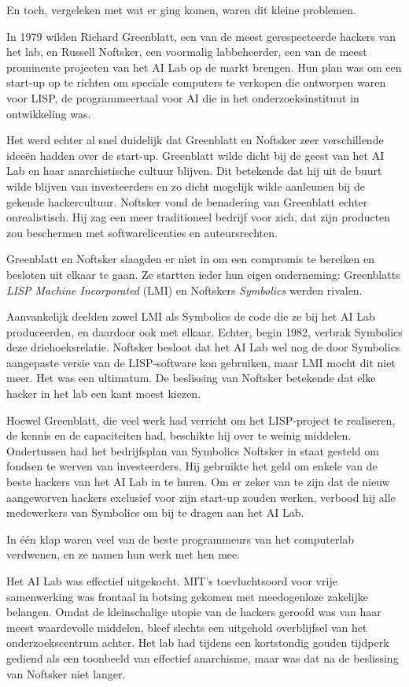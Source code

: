 \documentclass[
  a5paper,
  smalldemyvopaper,11pt,twoside,onecolumn,openright,extrafontsizes,
hidelinks]{memoir}
\begin{document}
En toch, vergeleken met wat er ging komen, waren dit kleine problemen.

In 1979 wilden Richard Greenblatt, een van de meest gerespecteerde
hackers van het lab, en Russell Noftsker, een voormalig labbeheerder,
een van de meest prominente projecten van het AI Lab op de markt
brengen. Hun plan was om een start-up op te richten om speciale
computers te verkopen die ontworpen waren voor LISP, de programmeertaal
voor AI die in het onderzoeksinstituut in ontwikkeling was.

Het werd echter al snel duidelijk dat Greenblatt en Noftsker zeer
verschillende ideeën hadden over de start-up. Greenblatt wilde dicht bij
de geest van het AI Lab en haar anarchistische cultuur blijven. Dit
betekende dat hij uit de buurt wilde blijven van investeerders en zo
dicht mogelijk wilde aanleunen bij de gekende hackercultuur. Noftsker
vond de benadering van Greenblatt echter onrealistisch. Hij zag een meer
traditioneel bedrijf voor zich, dat zijn producten zou beschermen met
softwarelicenties en auteursrechten.

Greenblatt en Noftsker slaagden er niet in om een compromis te bereiken
en besloten uit elkaar te gaan. Ze startten ieder hun eigen onderneming:
Greenblatts \emph{LISP Machine Incorporated} (LMI) en Noftskers
\emph{Symbolics} werden rivalen.

Aanvankelijk deelden zowel LMI als Symbolics de code die ze bij het AI
Lab produceerden, en daardoor ook met elkaar. Echter, begin 1982,
verbrak Symbolics deze driehoeksrelatie. Noftsker besloot dat het AI Lab
wel nog de door Symbolics aangepaste versie van de LISP-software kon
gebruiken, maar LMI mocht dit niet meer. Het was een ultimatum. De
beslissing van Noftsker betekende dat elke hacker in het lab een kant
moest kiezen.

Hoewel Greenblatt, die veel werk had verricht om het LISP-project te
realiseren, de kennis en de capaciteiten had, beschikte hij over te
weinig middelen. Ondertussen had het bedrijfsplan van Symbolics Noftsker
in staat gesteld om fondsen te werven van investeerders. Hij gebruikte
het geld om enkele van de beste hackers van het AI Lab in te huren. Om
er zeker van te zijn dat de nieuw aangeworven hackers exclusief voor
zijn start-up zouden werken, verbood hij alle medewerkers van Symbolics
om bij te dragen aan het AI Lab.

In één klap waren veel van de beste programmeurs van het computerlab
verdwenen, en ze namen hun werk met hen mee.

Het AI Lab was effectief uitgekocht. MIT's toevluchtsoord voor vrije
samenwerking was frontaal in botsing gekomen met meedogenloze zakelijke
belangen. Omdat de kleinschalige utopie van de hackers geroofd was van
haar meest waardevolle middelen, bleef slechts een uitgehold
overblijfsel van het onderzoekscentrum achter. Het lab had tijdens een
kortstondig gouden tijdperk gediend als een toonbeeld van effectief
anarchisme, maar was dat na de beslissing van Noftsker niet langer.
\end{document}
